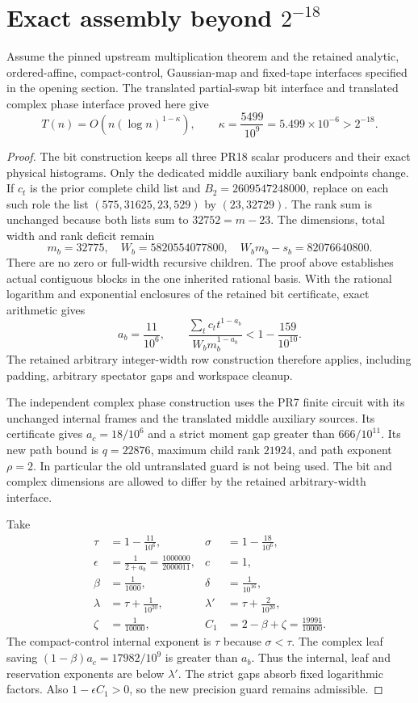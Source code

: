 \section{Exact assembly beyond $2^{-18}$}
\label{sec:translated-partial-assembly}

\begin{theorem}
Assume the pinned upstream multiplication theorem and the retained analytic,
ordered-affine, compact-control, Gaussian-map and fixed-tape interfaces
specified in the opening section. The translated partial-swap bit interface
and translated complex phase interface proved here give
\[
 T(n)=O\!\left(n(\log n)^{1-\kappa}\right),\qquad
 \boxed{\kappa=\frac{5499}{10^9}=5.499\times10^{-6}>2^{-18}}.
\]
\end{theorem}
\begin{proof}
The bit construction keeps all three PR18 scalar producers and their exact
physical histograms. Only the dedicated middle auxiliary bank endpoints
change. If $c_t$ is the prior complete child list and $B_2=2609547248000$,
replace on each such role the list $(575,31625,23,529)$ by $(23,32729)$.
The rank sum is unchanged because both lists sum to $32752=m-23$.
The dimensions, total width and rank deficit remain
\[
 m_b=32775,\quad W_b=5820554077800,\quad
 W_bm_b-s_b=82076640800.
\]
There are no zero or full-width recursive children. The proof above
establishes actual contiguous blocks in the one inherited rational basis.
With the rational logarithm and exponential enclosures of the retained
bit certificate, exact arithmetic gives
\[
 a_b=\frac{11}{10^6},\qquad
 \frac{\sum_t c_t t^{1-a_b}}{W_bm_b^{1-a_b}}
 <1-\frac{159}{10^{10}}.
\]
The retained arbitrary integer-width row construction therefore applies,
including padding, arbitrary spectator gaps and workspace cleanup.

The independent complex phase construction uses the PR7 finite circuit
with its unchanged internal frames and the translated middle auxiliary
sources. Its certificate gives $a_c=18/10^6$ and a strict moment gap
greater than $666/10^{11}$. Its new path bound is $q=22876$, maximum
child rank $21924$, and path exponent $\rho=2$. In particular the old
untranslated guard is not being used. The bit and complex dimensions are
allowed to differ by the retained arbitrary-width interface.

Take
\[
\begin{aligned}
 \tau&=1-\frac{11}{10^6},&\sigma&=1-\frac{18}{10^6},\\
 \epsilon&=\frac1{2+a_b}=\frac{1000000}{2000011},&c&=1,\\
 \beta&=\frac1{1000},&\delta&=\frac1{10^{16}},\\
 \lambda&=\tau+\frac1{10^{20}},&\lambda'&=\tau+\frac2{10^{20}},\\
 \zeta&=\frac1{10000},&C_1&=2-\beta+\zeta=\frac{19991}{10000}.
\end{aligned}
\]
The compact-control internal exponent is $\tau$ because $\sigma<\tau$.
The complex leaf saving $(1-\beta)a_c=17982/10^9$ is greater than
$a_b$. Thus the internal, leaf and reservation exponents are below
$\lambda'$. The strict gaps absorb fixed logarithmic factors. Also
$1-\epsilon C_1>0$, so the new precision guard remains admissible.


\end{proof}

